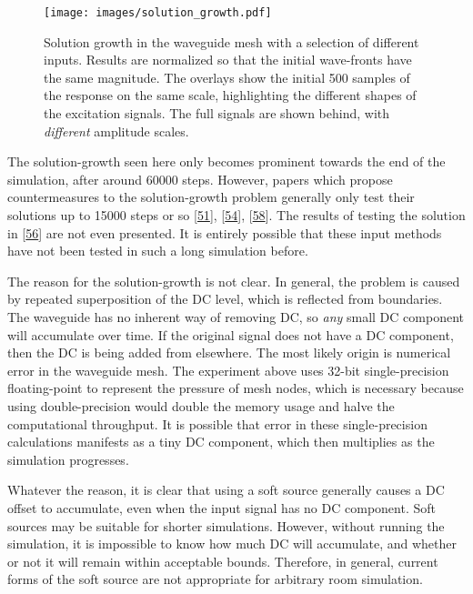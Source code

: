 \documentclass[]{scrreprt}
\begin{document}
\begin{figure}[htbp]
\centering
\texttt{[image: images/solution\_growth.pdf]}
\caption{Solution growth in the waveguide mesh with a selection of
different inputs. Results are normalized so that the initial wave-fronts
have the same magnitude. The overlays show the initial 500 samples of
the response on the same scale, highlighting the different shapes of the
excitation signals. The full signals are shown behind, with
\emph{different} amplitude scales. \label{fig:solution_growth_results}}
\end{figure}

The solution-growth seen here only becomes prominent towards the end of
the simulation, after around 60000 steps. However, papers which propose
countermeasures to the solution-growth problem generally only test their
solutions up to 15000 steps or so
{[}\protect\hyperlink{ref-jeongux5fsourceux5f2012}{51}{]},
{[}\protect\hyperlink{ref-sheafferux5fphysicalux5f2014}{54}{]},
{[}\protect\hyperlink{ref-sheafferux5fphysically-constrainedux5f2012}{58}{]}.
The results of testing the solution in
{[}\protect\hyperlink{ref-dimitrijevicux5foptimizationux5f2015}{56}{]}
are not even presented. It is entirely possible that these input methods
have not been tested in such a long simulation before.

The reason for the solution-growth is not clear. In general, the problem
is caused by repeated superposition of the DC level, which is reflected
from boundaries. The waveguide has no inherent way of removing DC, so
\emph{any} small DC component will accumulate over time. If the original
signal does not have a DC component, then the DC is being added from
elsewhere. The most likely origin is numerical error in the waveguide
mesh. The experiment above uses 32-bit single-precision floating-point
to represent the pressure of mesh nodes, which is necessary because
using double-precision would double the memory usage and halve the
computational throughput. It is possible that error in these
single-precision calculations manifests as a tiny DC component, which
then multiplies as the simulation progresses.

Whatever the reason, it is clear that using a soft source generally
causes a DC offset to accumulate, even when the input signal has no DC
component. Soft sources may be suitable for shorter simulations.
However, without running the simulation, it is impossible to know how
much DC will accumulate, and whether or not it will remain within
acceptable bounds. Therefore, in general, current forms of the soft
source are not appropriate for arbitrary room simulation.
\end{document}
